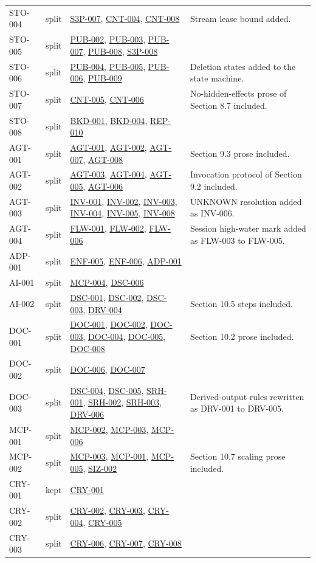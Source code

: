 \documentclass[11pt,a4paper]{article}
\newcommand{\rr}[1]{\hyperlink{req:#1}{#1}}
\begin{document}
\begin{longtable}{@{}P{0.16\textwidth}P{0.09\textwidth}P{0.37\textwidth}P{0.28\textwidth}@{}}
STO-004 & split & \rr{S3P-007}, \rr{CNT-004}, \rr{CNT-008} & Stream lease bound added.\\
STO-005 & split & \rr{PUB-002}, \rr{PUB-003}, \rr{PUB-007}, \rr{PUB-008}, \rr{S3P-008} & \\
STO-006 & split & \rr{PUB-004}, \rr{PUB-005}, \rr{PUB-006}, \rr{PUB-009} & Deletion states added to the state machine.\\
STO-007 & split & \rr{CNT-005}, \rr{CNT-006} & No-hidden-effects prose of Section 8.7 included.\\
STO-008 & split & \rr{BKD-001}, \rr{BKD-004}, \rr{REP-010} & \\
AGT-001 & split & \rr{AGT-001}, \rr{AGT-002}, \rr{AGT-007}, \rr{AGT-008} & Section 9.3 prose included.\\
AGT-002 & split & \rr{AGT-003}, \rr{AGT-004}, \rr{AGT-005}, \rr{AGT-006} & Invocation protocol of Section 9.2 included.\\
AGT-003 & split & \rr{INV-001}, \rr{INV-002}, \rr{INV-003}, \rr{INV-004}, \rr{INV-005}, \rr{INV-008} & UNKNOWN resolution added as INV-006.\\
AGT-004 & split & \rr{FLW-001}, \rr{FLW-002}, \rr{FLW-006} & Session high-water mark added as FLW-003 to FLW-005.\\
ADP-001 & split & \rr{ENF-005}, \rr{ENF-006}, \rr{ADP-001} & \\
AI-001 & split & \rr{MCP-004}, \rr{DSC-006} & \\
AI-002 & split & \rr{DSC-001}, \rr{DSC-002}, \rr{DSC-003}, \rr{DRV-004} & Section 10.5 steps included.\\
DOC-001 & split & \rr{DOC-001}, \rr{DOC-002}, \rr{DOC-003}, \rr{DOC-004}, \rr{DOC-005}, \rr{DOC-008} & Section 10.2 prose included.\\
DOC-002 & split & \rr{DOC-006}, \rr{DOC-007} & \\
DOC-003 & split & \rr{DSC-004}, \rr{DSC-005}, \rr{SRH-001}, \rr{SRH-002}, \rr{SRH-003}, \rr{DRV-006} & Derived-output rules rewritten as DRV-001 to DRV-005.\\
MCP-001 & split & \rr{MCP-002}, \rr{MCP-003}, \rr{MCP-006} & \\
MCP-002 & split & \rr{MCP-003}, \rr{MCP-001}, \rr{MCP-005}, \rr{SIZ-002} & Section 10.7 scaling prose included.\\
CRY-001 & kept & \rr{CRY-001} & \\
CRY-002 & split & \rr{CRY-002}, \rr{CRY-003}, \rr{CRY-004}, \rr{CRY-005} & \\
CRY-003 & split & \rr{CRY-006}, \rr{CRY-007}, \rr{CRY-008} & \\

\end{longtable}
\end{document}
